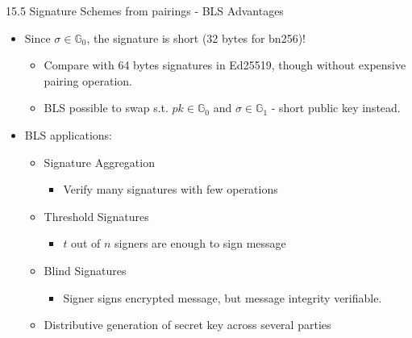 \documentclass[aspectratio=169,xcolor=dvipsnames]{beamer}
\newcommand{\Go}{\mathbb{G}_0}
\newcommand{\Gi}{\mathbb{G}_1}
\begin{document}
\begin{frame}{15.5 Signature Schemes from pairings - BLS Advantages}
\begin{itemize}
    \item Since $\sigma \in \Go$, the signature is short (32 bytes for bn256)!
    \begin{itemize}
        \item Compare with 64 bytes signatures in Ed25519, though without expensive pairing operation.
        \item BLS possible to swap s.t. $pk \in \Go$ and $\sigma \in \Gi$ - short public key instead. 
    \end{itemize}
    \item BLS applications:
    \begin{itemize}
        \item Signature Aggregation
        \begin{itemize}
            \item Verify many signatures with few operations
        \end{itemize}
        \item Threshold Signatures
        \begin{itemize}
            \item $t$ out of $n$ signers are enough to sign message 
        \end{itemize}
        \item Blind Signatures
        \begin{itemize}
            \item Signer signs encrypted message, but message integrity verifiable.
        \end{itemize}
        \item Distributive generation of secret key across several parties
    \end{itemize}
\end{itemize}
\end{frame}
\end{document}
